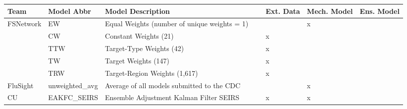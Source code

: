 \begin{table*}
\setlength{\tabcolsep}{4pt} 
\begin{tabular}{p{1.6cm} l p{7.5cm} l  p{1cm}  p{1cm} p{1cm}}
\hline
Team     & Model Abbr& Model Description & & Ext. Data & Mech. Model & Ens. Model \\ 
\hline

FSNetwork & EW       & Equal Weights (number of unique weights = 1) & ~ & ~  & x\\
 & CW       & Constant Weights (21) &  & x & \\
 & TTW      & Target-Type Weights (42) & & x & \\ 
 & TW       & Target Weights (147) & &  x & \\ 
 & TRW      & Target-Region Weights (1,617) & & x & \\ 
\hline
FluSight & unweighted\_avg       & Average of all models submitted to the CDC & \cite{McGowan2018}  &   & x\\
\hline
CU       & EAKFC\_SEIRS       & Ensemble Adjustment Kalman Filter SEIRS & \cite{Pei2017}  & x & x & \\ 


\end{tabular}
\end{table*}
